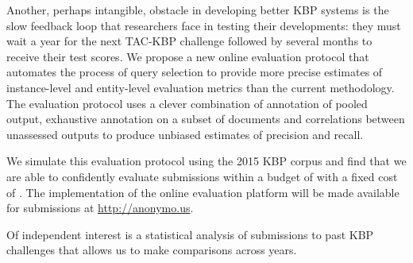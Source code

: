Another, perhaps intangible, obstacle in developing better KBP systems is the slow feedback loop that researchers face in testing their developments: they must wait a year for the next TAC-KBP challenge followed by several months to receive their test scores.
We propose a new online evaluation protocol that automates the process of query selection to provide more precise estimates of instance-level and entity-level evaluation metrics than the current methodology.
The evaluation protocol uses a clever combination of annotation of pooled output, exhaustive annotation on a subset of documents and correlations between unassessed outputs to produce unbiased estimates of precision and recall.

We simulate this evaluation protocol using the 2015 KBP corpus and find that we are able to confidently evaluate submissions within a budget of  with a fixed cost of .
The implementation of the online evaluation platform will be made available for submissions at \url{http://anonymo.us}.

Of independent interest is a statistical analysis of submissions to past KBP challenges that allows us to make comparisons across years.







